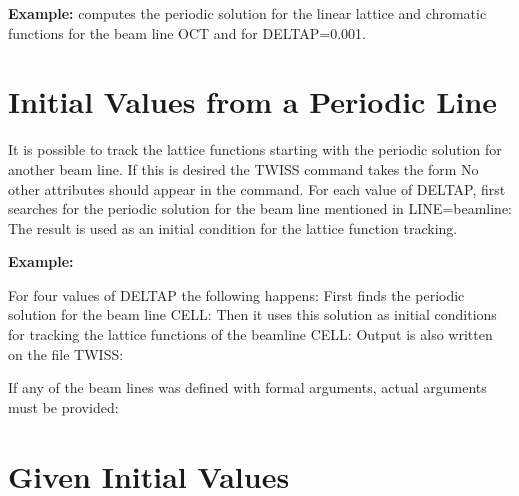\textbf{Example:} 
computes the periodic solution for the linear lattice and
chromatic functions for the beam line OCT and for DELTAP=0.001. 


\section{Initial Values from a Periodic Line}
\label{sec:twissinitial}

It is possible to track the lattice functions starting with the periodic
solution for another beam line. If this is desired the TWISS command
takes the form  
No other attributes should appear in the command. For each value of
DELTAP, \madx first searches for the periodic solution for the beam line
mentioned in LINE=beamline: The result is used as an initial condition
for the lattice function tracking. 

\textbf{Example:} 

For four values of DELTAP the following happens: First \madx finds the
periodic solution for the beam line CELL: Then it uses this solution as
initial conditions for tracking the lattice functions of the beamline
CELL: Output is also written on the file TWISS:  

If any of the beam lines was defined with formal arguments, actual
arguments must be provided:  

\section{Given Initial Values}

